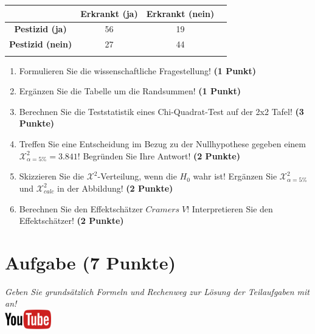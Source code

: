 \documentclass[a4paper, 9pt]{scrartcl}\usepackage[]{graphicx}\usepackage[]{xcolor}
\begin{document}
\begin{center}
  \Large
  \begin{tabular}{c|c|c|c}
     & \textbf{Erkrankt (ja)} & \textbf{Erkrankt (nein)} &  \strut\\
    \hline
    \textbf{Pestizid (ja)} & 56  & 19  &     \strut\\
    \hline
    \textbf{Pestizid (nein)} & 27  & 44  &      \strut\\
    \hline
     \phantom{100} & \phantom{100}  & \phantom{100}  &  \phantom{100}  \strut\\
  \end{tabular}
\end{center}

\vspace{5Ex}

\begin{enumerate}
\item Formulieren Sie die wissenschaftliche Fragestellung! \textbf{(1 Punkt)}
\item Erg{\"a}nzen Sie die Tabelle um die Randsummen! \textbf{(1 Punkt)} 
\item Berechnen Sie die Teststatistik eines Chi-Quadrat-Test auf der 2x2
  Tafel! \textbf{(3 Punkte)}
\item Treffen Sie eine Entscheidung im Bezug zu der Nullhypothese gegeben
  einem $\mathcal{X}^2_{\alpha = 5\%} = 3.841$! Begr{\"u}nden Sie Ihre Antwort!
  \textbf{(2 Punkte)}
\item Skizzieren Sie die $\mathcal{X}^2$-Verteilung, wenn die $H_0$ wahr
  ist! Erg{\"a}nzen Sie  $\mathcal{X}^2_{\alpha = 5\%}$ und
  $\mathcal{X}^2_{calc}$ in der Abbildung! \textbf{(2 Punkte)}
\item Berechnen Sie den Effektsch{\"a}tzer $Cramers\; V$! Interpretieren Sie den
  Effektsch{\"a}tzer! \textbf{(2 Punkte)}
\end{enumerate} 
\clearpage

\section{Aufgabe \hfill (7 Punkte)}

\textit{Geben Sie grunds{\"a}tzlich Formeln und Rechenweg zur L{\"o}sung der
  Teilaufgaben mit an!} \\[1Ex]

\hfill\href{https://youtu.be/jakM7fHyZfU}{\includegraphics[width =
  2cm]{img/youtube}}\\[1Ex]
\end{document}
